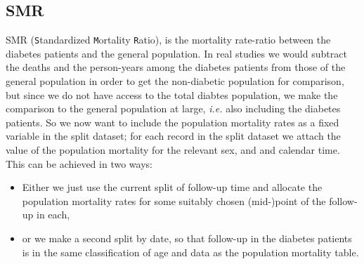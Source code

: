 \subsection*{SMR}
SMR (\texttt{S}tandardized \texttt{M}ortality \texttt{R}atio), is
the mortality rate-ratio between the diabetes patients and the
general population.  In real studies we would subtract the deaths
and the person-years among the diabetes patients from those of the
general population in order to get the non-diabetic population for
comparison, but since we do not have access to the total diabtes
population, we make the comparison to the general population at
large, \textit{i.e.} also including the diabetes patients.
So we now want to include the population mortality rates as a fixed
variable in the split dataset; for each record in the split dataset we
attach the value of the population mortality for the relevant sex, and
and calendar time.
This can be achieved in two ways:
\begin{itemize}
\item Either we just use the current split of follow-up time and
  allocate the population mortality rates for some suitably chosen
  (mid-)point of the follow-up in each,
\item or we make a second split by date, so that follow-up in the
  diabetes patients is in the same classification of age and data as
  the population mortality table.
\end{itemize}
